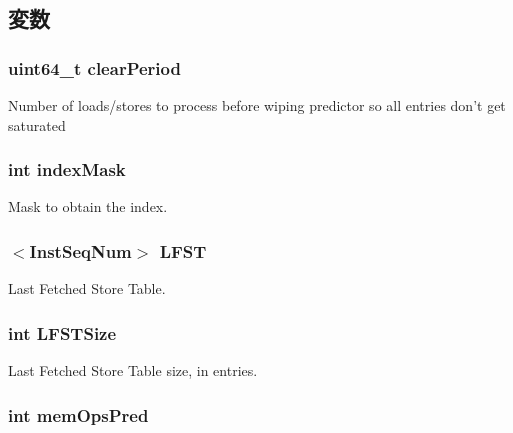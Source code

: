 \subsection{変数}
\hypertarget{classStoreSet_a9ae4231099a7cc00dcbf234aa174af44}{
\subsubsection[{clearPeriod}]{\setlength{\rightskip}{0pt plus 5cm}uint64\_\-t {\bf clearPeriod}}}
\label{classStoreSet_a9ae4231099a7cc00dcbf234aa174af44}
Number of loads/stores to process before wiping predictor so all entries don't get saturated \hypertarget{classStoreSet_a33e6f6648561ce74ee753dd190356fd0}{
\subsubsection[{indexMask}]{\setlength{\rightskip}{0pt plus 5cm}int {\bf indexMask}}}
\label{classStoreSet_a33e6f6648561ce74ee753dd190356fd0}
Mask to obtain the index. \hypertarget{classStoreSet_a8f418b57f9abc868817afd8026effc89}{
\subsubsection[{LFST}]{$<${\bf InstSeqNum}$>$ {\bf LFST}}}
\label{classStoreSet_a8f418b57f9abc868817afd8026effc89}
Last Fetched Store Table. \hypertarget{classStoreSet_a8ff9a6f977f155a663ce56418b68e9cd}{
\subsubsection[{LFSTSize}]{\setlength{\rightskip}{0pt plus 5cm}int {\bf LFSTSize}}}
\label{classStoreSet_a8ff9a6f977f155a663ce56418b68e9cd}
Last Fetched Store Table size, in entries. \hypertarget{classStoreSet_aa51123e118112a84b5139b216be38d8f}{
\subsubsection[{memOpsPred}]{\setlength{\rightskip}{0pt plus 5cm}int {\bf memOpsPred}}}
